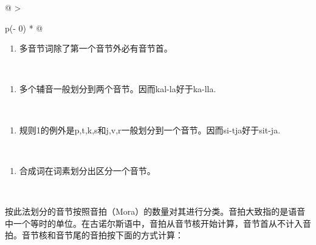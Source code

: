 \begin{longtable}[]{@{}
  >{\raggedright\arraybackslash}p{(\columnwidth - 0\tabcolsep) * }@{}}
  \toprule\noalign{}
  \begin{minipage}[b]{\linewidth}\raggedright
    \begin{enumerate}
      \def\labelenumi{\arabic{enumi}.}
      \item
            多音节词除了第一个音节外必有音节首。
    \end{enumerate}
  \end{minipage} \\
  \midrule\noalign{}
  \endhead
  \bottomrule\noalign{}
  \endlastfoot
  \begin{minipage}[t]{\linewidth}\raggedright
    \begin{enumerate}
      \def\labelenumi{\arabic{enumi}.}
      \setcounter{enumi}{1}
      \item
            多个辅音一般划分到两个音节。因而kal-la好于ka-lla.
    \end{enumerate}
  \end{minipage} \\
  \begin{minipage}[t]{\linewidth}\raggedright
    \begin{enumerate}
      \def\labelenumi{\arabic{enumi}.}
      \setcounter{enumi}{2}
      \item
            规则1的例外是p,t,k,s和j,v,r一般划分到一个音节。因而si-tja好于sit-ja.
    \end{enumerate}
  \end{minipage} \\
  \begin{minipage}[t]{\linewidth}\raggedright
    \begin{enumerate}
      \def\labelenumi{\arabic{enumi}.}
      \setcounter{enumi}{3}
      \item
            合成词在词素划分出区分一个音节。
    \end{enumerate}
  \end{minipage} \\
\end{longtable}

按此法划分的音节按照音拍（Mora）的数量对其进行分类。音拍大致指的是语音中一个等时的单位。在古诺尔斯语中，音拍从音节核开始计算，音节首从不计入音拍。音节核和音节尾的音拍按下面的方式计算：

